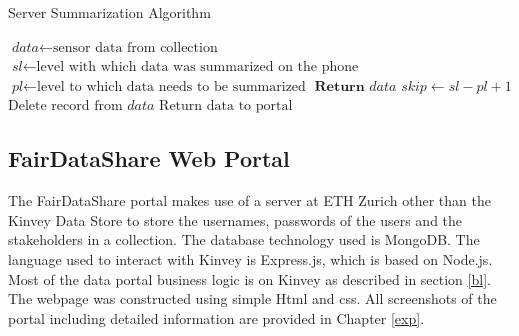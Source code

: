 \begin{algorithm}
\caption{Server Summarization Algorithm}\label{sum1}
\begin{algorithmic}[1]
\State $\textit{data} \gets \text{sensor data from collection}$
\State $\textit{sl} \gets \text{level with which data was summarized on the phone}$
\State $\textit{pl} \gets \text{level to which data needs to be summarized}$
	\State $\textbf{Return }\textit{data}$
\Else
	\State $\textit{skip} \gets \textit{sl}-\textit{pl}+1$
 	 \State $\text{Delete record from}\textit{ data}$
 	 \EndFor
\EndIf
\State $\text{Return data to portal}$
\EndProcedure
\end{algorithmic}
\end{algorithm}

\subsection{FairDataShare Web Portal}
The FairDataShare portal makes use of a server at ETH Zurich other than the Kinvey Data Store to store the usernames, passwords of the users and the stakeholders in a collection. The database technology used is MongoDB. The language used to interact with Kinvey is Express.js, which is based on Node.js. Most of the data portal business logic is on Kinvey as described in section \ref{bl}. The webpage was constructed using simple Html and css. All screenshots of the portal including detailed information are provided in Chapter \ref{exp}.









